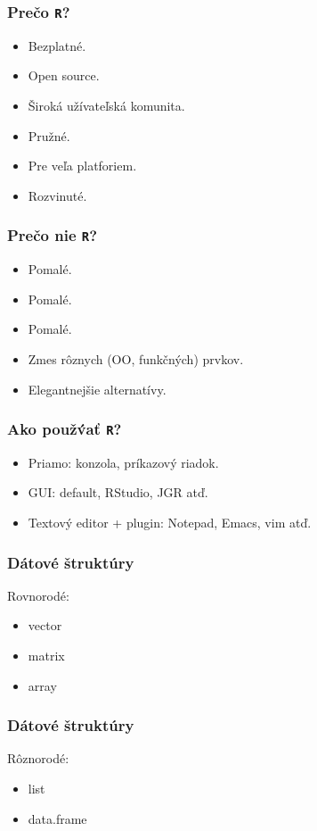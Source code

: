 \documentclass[14pt]{beamer}
\title[\texttt{R}]{\resizebox{0.25\linewidth}{!}{\'Uvod do \texttt{R}}}
\author{\href{https://pds.ceu.hu/medzihorsky}{Juraj Medzihorsky}}
\institute{\href{http://www.ceu.hu}{\texttt{[image: CEU\_logo\_long.pdf]}}}
\date{\href{http://muni.cz/}{\texttt{[image: munilogo.pdf]}}\\12. december 2013}
\begin{document}
\frame{\titlepage}

\begin{frame}
	\frametitle{Pre\v{c}o \texttt{R}?}
	\begin{itemize}
		\item 	Bezplatn\'e.
		\item	Open source.
		\item 	\v{S}irok\'a u\v{z}\'ivate\v{l}sk\'a komunita.
		\item	Pru\v{z}n\'e.
		\item 	Pre ve\v{l}a platforiem.
		\item 	Rozvinut\'e.
	\end{itemize}
\end{frame}

\begin{frame}
	\frametitle{Pre\v{c}o nie \texttt{R}?}
	\begin{itemize}
		\item 	Pomal\'e.
		\item	Pomal\'e.
		\item 	Pomal\'e.
		\item	Zmes r\^{o}znych (OO, funk\v{c}n\'ych) prvkov.
		\item 	Elegantnej\v{s}ie alternat\'ivy. 
	\end{itemize}
\end{frame}

\begin{frame}
	\frametitle{Ako pou\v{z}\'va\v{t} \texttt{R}?}
	\begin{itemize}
		\item 	Priamo: konzola, pr\'ikazov\'y riadok.
		\item	GUI: default, RStudio, JGR at\v{d}.
		\item 	Textov\'y editor + plugin:  Notepad, Emacs, vim at\v{d}.
	\end{itemize}
\end{frame}

\begin{frame}
	\frametitle{D\'atov\'e \v{s}trukt\'ury}
	Rovnorod\'e:
	\begin{itemize}
		\item 	vector
		\item	matrix
		\item 	array
	\end{itemize}
\end{frame}

\begin{frame}
	\frametitle{D\'atov\'e \v{s}trukt\'ury}
	R\^{o}znorod\'e:
	\begin{itemize}
		\item	list
		\item	data.frame
	\end{itemize}
\end{frame}
\end{document}
